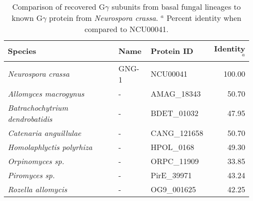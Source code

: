 \begin{table}[htbp]
\caption[G$\gamma$ subunit comparison.]{Comparison of recovered G$\gamma$ subunits from basal fungal lineages to known G$\gamma$ protein from \textit{Neurospora crassa}. $^{a}$ Percent identity when compared to NCU00041.} 
\label{tab:ChRhodA_GGcomp}
\begin{tabular}{lllr}
  \hline
Species & Name & Protein ID & Identity$^{a}$ \\ 
  \hline
\emph{Neurospora crassa} & GNG-1 & NCU00041 & 100.00 \\ 
  \emph{Allomyces macrogynus} & - & AMAG\_18343 & 50.70 \\ 
  \emph{Batrachochytrium dendrobatidis} & - & BDET\_01032 & 47.95 \\ 
  \emph{Catenaria anguillulae} & - & CANG\_121658 & 50.70 \\ 
  \emph{Homolaphlyctis polyrhiza} & - & HPOL\_0168 & 49.30 \\ 
  \emph{Orpinomyces sp.} & - & ORPC\_11909 & 33.85 \\ 
  \emph{Piromyces sp.} & - & PirE\_39971 & 43.24 \\ 
  \emph{Rozella allomycis} & - & OG9\_001625 & 42.25 \\ 
   \hline
\end{tabular}
\end{table}
